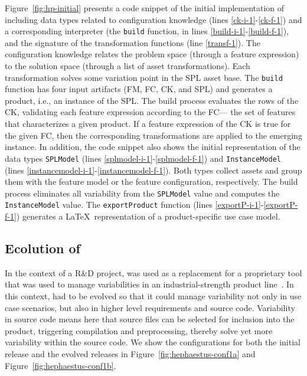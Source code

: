 Figure~\ref{fig:hp-initial} presents a code snippet of
the initial implementation of \hp{} including data types related to
configuration knowledge (lines \ref{ck-i-1}-\ref{ck-f-1}) and a
corresponding interpreter (the \texttt{build} function, in lines
\ref{build-i-1}-\ref{build-f-1}), and the signature of the
transformation functions (line \ref{transf-1}). The configuration
knowledge relates the problem space (through a feature expression) to
the solution space (through a list of asset transformations). Each
transformation solves some variation point in the SPL asset base. The
\texttt{build} function has four input artifacts (FM, FC, CK, and SPL)
and generates a product, i.e., an instance of the SPL. The build
process evaluates the rows of the CK, validating each feature
expression according to the FC--- the set of features that
characterizes a given product. If a feature expression of the CK is
true for the given FC, then the corresponding transformations are
applied to the emerging instance. In addition, the code snippet also
shows the initial representation of the data types \texttt{SPLModel}
(lines \ref{splmodel-i-1}-\ref{splmodel-f-1}) and
\texttt{InstanceModel} (lines
\ref{instancemodel-i-1}-\ref{instancemodel-f-1}). Both types collect
assets and group them with the feature model or the feature
configuration, respectively. The build process eliminates all
variability from the \texttt{SPLModel} value and computes the
\texttt{InstanceModel} value. The \texttt{exportProduct} function
(lines \ref{exportP-i-1}-\ref{exportP-f-1}) generates a \LaTeX\
representation of a product-specific use case model.


\subsection{Ecolution of \hp} 
\label{hp-evolution}

In the context of a R\&D project, \hp{} was used as a replacement for
a proprietary tool that was used to manage variabilities in an
industrial-strength product line~\cite{ferreira:2010}. In this
context, \hp{} had to be evolved so that it could manage variability
not only in use case scenarios, but also in higher level requirements
and source code. Variability in source code means here that source
files can be selected for inclusion into the product, triggering
compilation and preprocessing, thereby solve yet more variability
within the source code. We show the configurations for both the
initial release and the evolved releases in
Figure~\ref{fig:hephaestus-conf1a} and
Figure~\ref{fig:hephaestus-conf1b}.

